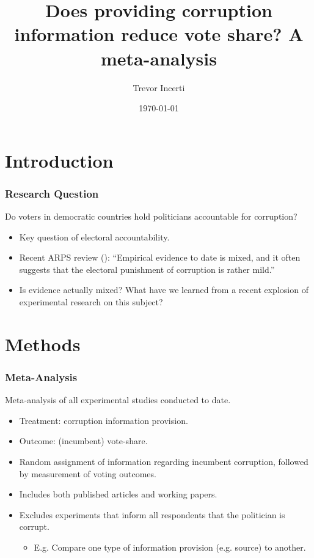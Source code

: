\documentclass[usenames,dvipsnames]{beamer}
\title{Does providing corruption information reduce vote share? A meta-analysis}
\date{\today}
\author{Trevor Incerti}
\begin{document}
\maketitle


\section{Introduction}

\begin{frame}
\frametitle{Research Question}
Do voters in democratic countries hold politicians accountable for corruption?
\pause
\begin{itemize}
\item Key question of electoral accountability. 
\pause
\item Recent ARPS review (\citet{de2017electoral}): ``Empirical evidence to date is \textcolor{Cerulean}{mixed}, and it often suggests that the electoral punishment of corruption is rather mild.'' 
\pause
\item Is evidence actually mixed? What have we learned from a recent explosion of experimental research on this subject?
\end{itemize}
\end{frame}


\section{Methods}

\begin{frame}
\frametitle{Meta-Analysis}
Meta-analysis of all \textcolor{Cerulean}{experimental} studies conducted to date. 
\pause
\begin{itemize}
\item \textcolor{Cerulean}{Treatment}: corruption information provision. 
\pause
\item \textcolor{Cerulean}{Outcome}: (incumbent) vote-share.
\pause
\item Random assignment of information regarding
incumbent corruption, followed by measurement of voting outcomes.
\pause
\item Includes both \textcolor{Cerulean}{published articles and working papers}.
\pause
\item Excludes experiments that inform all respondents that the politician is corrupt.
\begin{itemize}
\item E.g. Compare one type of information provision (e.g. source) to another.
\end{itemize}
\end{itemize}
\end{frame}
\end{document}
